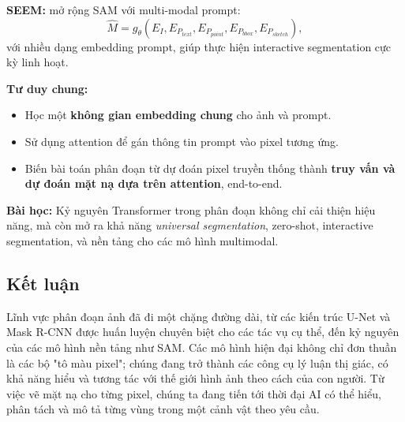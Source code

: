 \textbf{SEEM:} \cite{Zou2023} mở rộng SAM với multi-modal prompt:
\begin{equation}
	\hat{M} = g_\theta(E_I, E_{P_{text}}, E_{P_{point}}, E_{P_{bbox}}, E_{P_{sketch}}),
\end{equation}
với nhiều dạng embedding prompt, giúp thực hiện interactive segmentation cực kỳ linh hoạt.

\textbf{Tư duy chung:}
\begin{itemize}
	\item Học một \textbf{không gian embedding chung} cho ảnh và prompt.
	\item Sử dụng attention để gán thông tin prompt vào pixel tương ứng.
	\item Biến bài toán phân đoạn từ dự đoán pixel truyền thống thành \textbf{truy vấn và dự đoán mặt nạ dựa trên attention}, end-to-end.
\end{itemize}

\textbf{Bài học:} Kỷ nguyên Transformer trong phân đoạn không chỉ cải thiện hiệu năng, mà còn mở ra khả năng \textit{universal segmentation}, zero-shot, interactive segmentation, và nền tảng cho các mô hình multimodal.


\subsection{Kết luận}
Lĩnh vực phân đoạn ảnh đã đi một chặng đường dài, từ các kiến trúc U-Net và Mask R-CNN được huấn luyện chuyên biệt cho các tác vụ cụ thể, đến kỷ nguyên của các mô hình nền tảng như SAM. Các mô hình hiện đại không chỉ đơn thuần là các bộ "tô màu pixel"; chúng đang trở thành các công cụ lý luận thị giác, có khả năng hiểu và tương tác với thế giới hình ảnh theo cách của con người. Từ việc vẽ mặt nạ cho từng pixel, chúng ta đang tiến tới thời đại AI có thể hiểu, phân tách và mô tả từng vùng trong một cảnh vật theo yêu cầu.

